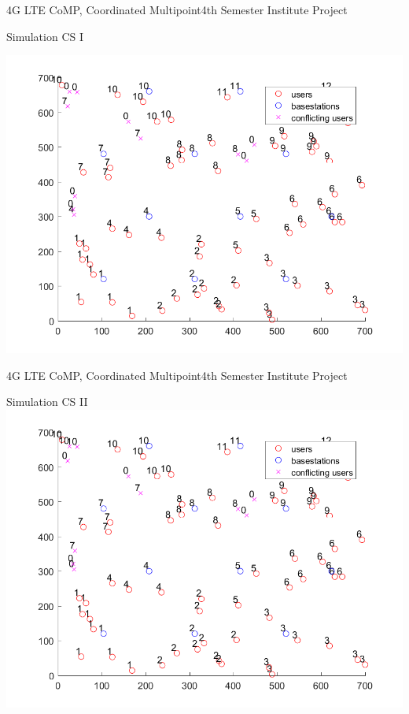 \documentclass[xcolor={cmyk}]{beamer}
\begin{document}
 \begin{frame}{4G LTE CoMP, Coordinated Multipoint}{4th Semester Institute Project}
 \begin{block}{Simulation CS I}
 
 \includegraphics[width=\linewidth,height=\textheight,keepaspectratio]{MapPlotCS1.png}
 \end{block}
 \end{frame}
 
 \begin{frame}{4G LTE CoMP, Coordinated Multipoint}{4th Semester Institute Project}
 \begin{block}{Simulation CS II}
 \includegraphics[width=\linewidth,height=\textheight,keepaspectratio]{MapPlotCS2.png}
 \end{block}
 \end{frame}
 
\end{document}
